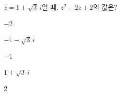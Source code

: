 $z=1+\sqrt{3}\,i$일 때, $z^2-2z+2$의 값은?
\begin{choices32}{\rule[-3ex]{0pt}{8ex}$-2$}{\rule[-3ex]{0pt}{8ex}$-1-\sqrt{3}\,i$}{\rule[-3ex]{0pt}{8ex}$-1$}{\rule[-3ex]{0pt}{8ex}$1+\sqrt{3}\,i$}{\rule[-3ex]{0pt}{8ex}$2$}\end{choices32}
